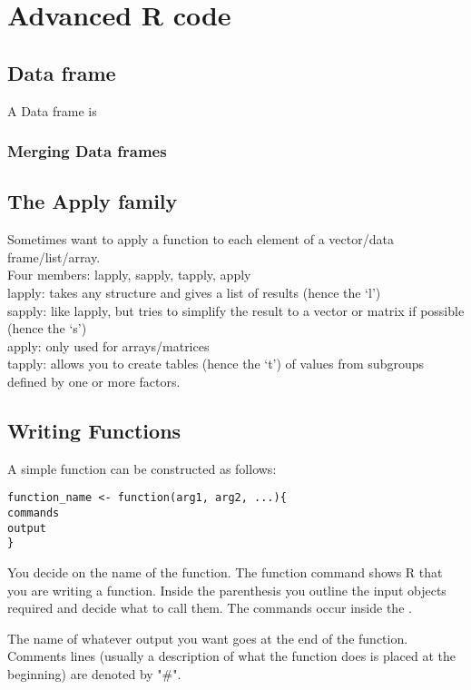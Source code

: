 \newpage
\chapter{Advanced R code}
\section{Data frame}
A Data frame is
\subsection{Merging Data frames}

\section{The Apply family}

Sometimes want to apply a function to each element of a
vector/data frame/list/array.
\\
Four members: lapply, sapply, tapply, apply
\\
lapply: takes any structure and gives a list of results (hence
the `l')
\\
sapply: like lapply, but tries to simplify the result to a
vector or matrix if possible (hence the `s')
\\
apply: only used for arrays/matrices
\\
tapply: allows you to create tables (hence the `t') of values
from subgroups defined by one or more factors.

\section{Writing Functions}

A simple function can be constructed as follows:

\begin{verbatim}
function_name <- function(arg1, arg2, ...){
commands
output
}
\end{verbatim}

You decide on the name of the function. The function command shows R that you are writing a function. Inside the parenthesis you outline the input objects required and decide what to call them. The commands occur inside the { }.

The name of whatever output you want goes at the end of the function. Comments lines (usually a description of what the function does is placed at the beginning) are denoted by "\#".

